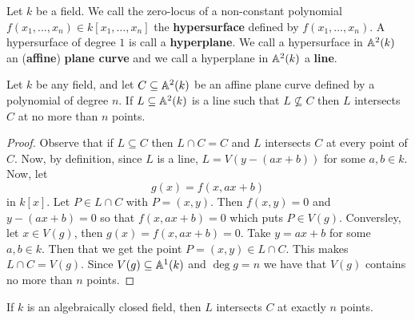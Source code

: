 \begin{definition}
  Let $k$ be a field. We call the zero-locus of a non-constant
  polynomial $f(x_1, \dots, x_n) \in k[x_1, \dots, x_n]$ the
  \textbf{hypersurface} defined by $f(x_1, \dots, x_n)$. A
  hypersurface of degree $1$ is call a \textbf{hyperplane}. We call a
  hypersurface in $\mathbb{A}^2(k)$ an (\textbf{affine}) \textbf{plane curve}
  and we call a hyperplane in $\mathbb{A}^2(k)$ a \textbf{line}.
\end{definition}

\begin{theorem}\label{theorem_10.1.3}
  Let $k$ be any field, and let $C \subseteq \mathbb{A}^2(k)$ be an affine
  plane curve defined by a polynomial of degree $n$. If
  $L \subseteq \mathbb{A}^2(k)$ is a line such that $L \not\subseteq C$ then
  $L$ intersects $C$ at no more than $n$ points.
\end{theorem}
\begin{proof}
  Observe that if $L \subseteq C$ then $L \cap C=C$ and $L$ intersects
  $C$ at every point of  $C$.
  Now, by definition, since $L$ is a line, $L=V(y-(ax+b))$ for some
  $a,b \in k$. Now, let
  \begin{equation*}
    g(x)=f(x,ax+b)
  \end{equation*}
  in $k[x]$. Let $P \in L \cap C$ with $P=(x,y)$. Then $f(x,y)=0$ and
  $y-(ax+b)=0$ so that $f(x,ax+b)=0$ which puts $P \in V(g)$.
  Conversley, let $x \in V(g)$, then $g(x)=f(x,ax+b)=0$. Take $y=ax+b$
  for some $a,b \in k$. Then that we get the point $P=(x,y) \in L \cap C$.
  This makes $L \cap C=V(g)$. Since $V(g) \subseteq \mathbb{A}^1(k)$ and
  $\deg{g}=n$ we have that $V(g)$ contains no more than $n$ points.
\end{proof}
\begin{corollary}
  If $k$ is an algebraically closed field, then $L$ intersects $C$ at
  exactly $n$ points.
\end{corollary}

